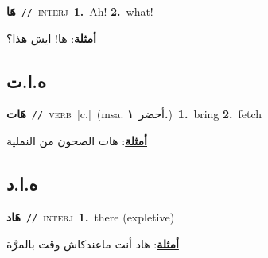 \documentclass[10pt,a4paper,twoside]{article} %
\begin{document}
\begin{multicols}{2}
{\setlength\topsep{0pt}\textbf{\foreignlanguage{arabic}{هَا}}\ {\color{gray}\texttt{//}\color{black}}\ \textsc{interj}\ \textbf{1.}~Ah!  \textbf{2.}~what!\  \begin{flushright}\color{gray}\foreignlanguage{arabic}{\textbf{\underline{\foreignlanguage{arabic}{أمثلة}}}: ها! ايش هذا؟}\end{flushright}\color{black}} \vspace{2mm}

\vspace{-3mm}
\subsection*{\color{blue}\foreignlanguage{arabic}{ه.ا.ت}\color{blue}{ (ntws)}} 

{\setlength\topsep{0pt}\textbf{\foreignlanguage{arabic}{هَات}}\ {\color{gray}\texttt{//}\color{black}}\ \textsc{verb}\ [c.]\ \color{gray}(msa. \foreignlanguage{arabic}{أحضر}~\foreignlanguage{arabic}{\textbf{١.}})\color{black}\ \textbf{1.}~bring  \textbf{2.}~fetch\  \begin{flushright}\color{gray}\foreignlanguage{arabic}{\textbf{\underline{\foreignlanguage{arabic}{أمثلة}}}: هات الصحون من النملية}\end{flushright}\color{black}} \vspace{2mm}

\vspace{-3mm}
\subsection*{\color{blue}\foreignlanguage{arabic}{ه.ا.د}\color{blue}{ (ntws)}} 

{\setlength\topsep{0pt}\textbf{\foreignlanguage{arabic}{هَاد}}\ {\color{gray}\texttt{//}\color{black}}\ \textsc{interj}\ \textbf{1.}~there (expletive)\  \begin{flushright}\color{gray}\foreignlanguage{arabic}{\textbf{\underline{\foreignlanguage{arabic}{أمثلة}}}: هاد أنت ماعندكاش وقت بالمرَّة}\end{flushright}\color{black}} \vspace{2mm}


\end{multicols}
\end{document}
